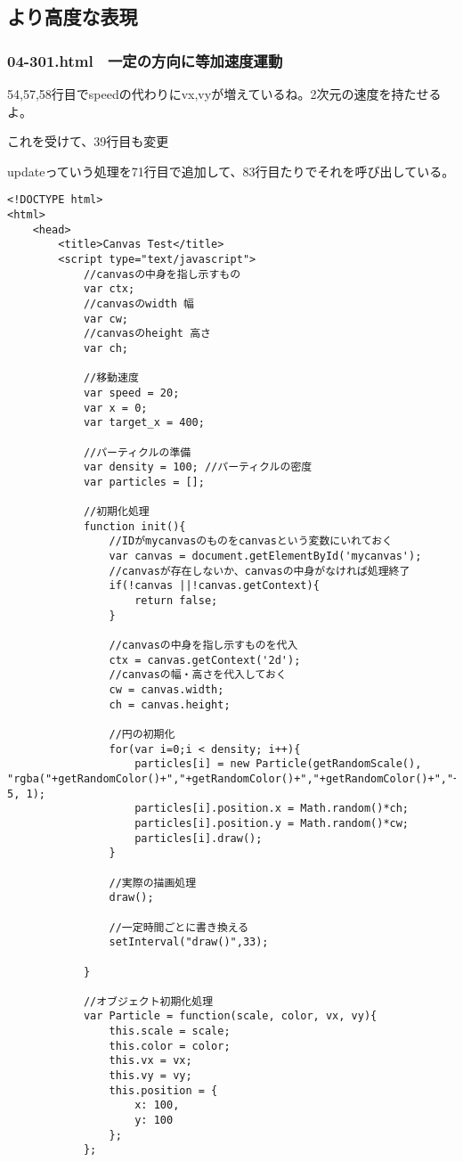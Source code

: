\documentclass[mingoth,11pt,a4j,uplatex]{jsarticle}
\begin{document}
\subsection{より高度な表現}
\subsubsection{04-301.html　一定の方向に等加速度運動}
54,57,58行目でspeedの代わりにvx,vyが増えているね。2次元の速度を持たせるよ。

これを受けて、39行目も変更

updateっていう処理を71行目で追加して、83行目たりでそれを呼び出している。

\begin{lstlisting}[caption=一定の方向に等加速度運動]
<!DOCTYPE html>
<html>
	<head>
		<title>Canvas Test</title>
		<script type="text/javascript">
			//canvasの中身を指し示すもの
			var ctx;
			//canvasのwidth 幅
			var cw;
			//canvasのheight 高さ
			var ch;
			
			//移動速度
			var speed = 20;
			var x = 0;
			var target_x = 400;
			
			//パーティクルの準備
			var density = 100; //パーティクルの密度
			var particles = [];
			
			//初期化処理
			function init(){
				//IDがmycanvasのものをcanvasという変数にいれておく
				var canvas = document.getElementById('mycanvas');
				//canvasが存在しないか、canvasの中身がなければ処理終了
				if(!canvas ||!canvas.getContext){
					return false;
				}
				
				//canvasの中身を指し示すものを代入
				ctx = canvas.getContext('2d');
				//canvasの幅・高さを代入しておく
				cw = canvas.width;
				ch = canvas.height;
				
				//円の初期化
				for(var i=0;i < density; i++){
					particles[i] = new Particle(getRandomScale(), "rgba("+getRandomColor()+","+getRandomColor()+","+getRandomColor()+","+getRandomAlpha()+")", 5, 1);
					particles[i].position.x = Math.random()*ch;
					particles[i].position.y = Math.random()*cw;
					particles[i].draw();			
				}
				
				//実際の描画処理
				draw();
				
				//一定時間ごとに書き換える
				setInterval("draw()",33);

			}
			
			//オブジェクト初期化処理
			var Particle = function(scale, color, vx, vy){
				this.scale = scale;
				this.color = color;
				this.vx = vx;
				this.vy = vy;
				this.position = {
					x: 100,
					y: 100
				};
			};
			

\end{lstlisting}
\end{document}

